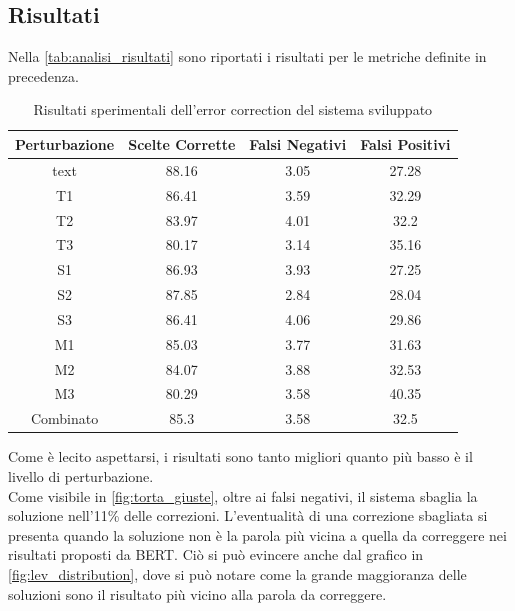 \documentclass[12pt]{article}
\begin{document}
\subsection{Risultati}

Nella \autoref{tab:analisi_risultati} sono riportati i risultati per le metriche definite in precedenza.
\begin{table}[H]
\centering
\begin{tabular}{cccc}
\textbf{Perturbazione} & \textbf{Scelte Corrette} & \textbf{Falsi Negativi} &  \textbf{Falsi Positivi} \\ \hline
text& 88.16& 3.05& 27.28\\
T1& 86.41& 3.59& 32.29\\
T2& 83.97& 4.01& 32.2\\
T3& 80.17& 3.14& 35.16\\
S1& 86.93& 3.93& 27.25\\
S2& 87.85& 2.84& 28.04\\
S3& 86.41& 4.06& 29.86\\
M1& 85.03& 3.77& 31.63\\
M2& 84.07& 3.88& 32.53\\
M3& 80.29& 3.58& 40.35\\
Combinato& 85.3& 3.58& 32.5\\
\end{tabular}
\caption{Risultati sperimentali dell'error correction del sistema sviluppato}
\label{tab:analisi_risultati}
\end{table}

Come è lecito aspettarsi, i risultati sono tanto migliori quanto più basso è il livello di perturbazione.\\
Come visibile in \autoref{fig:torta_giuste}, oltre ai falsi negativi, il sistema sbaglia la soluzione nell'11\% delle correzioni. L'eventualità di una correzione sbagliata si presenta quando la soluzione non è la parola più vicina a quella da correggere nei risultati proposti da BERT. Ciò si può evincere anche dal grafico in \autoref{fig:lev_distribution}, dove si può notare come la grande maggioranza delle soluzioni sono il risultato più vicino alla parola da correggere.
\end{document}

